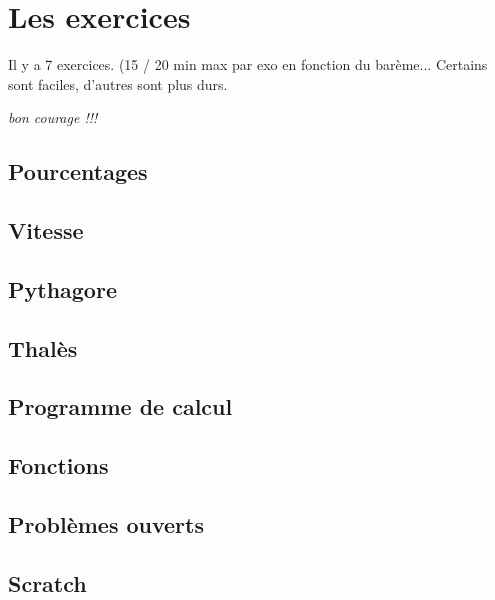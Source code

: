 \documentclass[12pt]{article}
\begin{document}
\section*{Les exercices}

Il y a 7 exercices. (15 / 20 min max par exo en fonction du barème... Certains sont faciles, d'autres sont plus durs. 

\textit{bon courage !!!}


\newpage


\begin{multicols}{2}

\subsection*{Pourcentages}

\vspace{5.5cm}

\subsection*{Vitesse}
    
\vspace{5.5cm}

\subsection*{Pythagore}

\vspace{5.5cm}

\subsection*{Thalès} 

\vspace{5.5cm}

\columnbreak

\subsection*{Programme de calcul}

\vspace{5.5cm}

\subsection*{Fonctions}

\vspace{5.5cm}

\subsection*{Problèmes ouverts}

\vspace{5.5cm}

\subsection*{Scratch}

\vspace{5.5cm}

\end{multicols}
\end{document}
